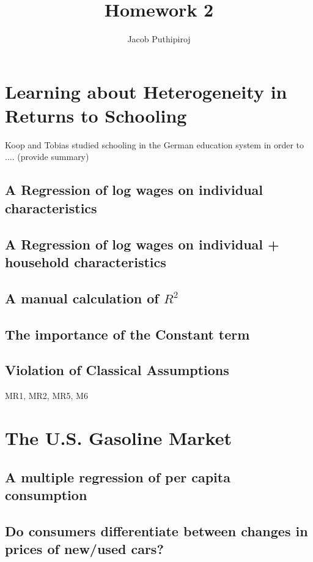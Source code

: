 \documentclass{article}
\begin{document}
\title{Homework 2}
\author{Jacob Puthipiroj}
\maketitle


\section{Learning about Heterogeneity in Returns to Schooling}

Koop and Tobias \cite{koop2004learning} studied schooling in the German education system in order to .... (provide summary)

\subsection{A Regression of log wages on individual characteristics}

\subsection{A Regression of log wages on individual + household characteristics}


\subsection{A manual calculation of $R^2$}


\subsection{The importance of the Constant term}

\subsection{Violation of Classical Assumptions}

MR1, MR2, MR5, M6

\section{The U.S. Gasoline Market}

\subsection{A multiple regression of per capita consumption}


\subsection{Do consumers differentiate between changes in prices of new/used cars?}
\end{document}
